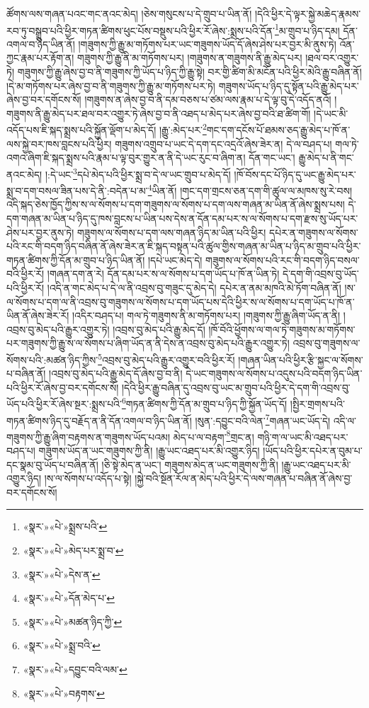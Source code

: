 ཚོགས་ལས་གཞན་པའང་གང་ནའང་མེད། །ཅེས་གསུངས་པ་དེ་གྲུབ་པ་ཡིན་ནོ། །དེའི་ཕྱིར་དེ་ལྟར་སྐྱེ་མཆེད་རྣམས་རབ་ཏུ་བསྒྲུབ་པའི་ཕྱིར་གཏན་ཚིགས་ཕུང་པོས་བསྡུས་པའི་ཕྱིར་རོ་ཞེས་:སྨྲས་པའི་དོན་\footnote{«སྣར་»«པེ་»སྨྲས་པའི་}མ་གྲུབ་པ་ཉིད་དམ། དོན་འགལ་བ་ཉིད་ཡིན་ནོ། །གཟུགས་ཀྱི་རྒྱུ་མ་གཏོགས་པར་ཡང་གཟུགས་ཡོད་དོ་ཞེས་ཤེས་པར་བྱར་མི་ནུས་ཏེ། འོན་ཀྱང་རྣམ་པར་རྟོག་ན། གཟུགས་ཀྱི་རྒྱུ་ནི་མ་གཏོགས་པར། །གཟུགས་ན་གཟུགས་ནི་རྒྱུ་མེད་པར། །ཐལ་བར་འགྱུར་ཏེ། གཟུགས་ཀྱི་རྒྱུ་ཞེས་བྱ་བ་ནི་གཟུགས་ཀྱི་ཡོད་པ་ཉིད་ཀྱི་རྒྱུ་སྟེ། བར་གྱི་ཚིག་མི་མངོན་པའི་ཕྱིར་མེའི་རྒྱུ་བཞིན་ནོ། །དེ་མ་གཏོགས་པར་ཞེས་བྱ་བ་ནི་གཟུགས་ཀྱི་རྒྱུ་མ་གཏོགས་པར་ཏེ། གཟུགས་ཡོད་པ་ཉིད་དུ་སྟོན་པའི་རྒྱུ་མེད་པར་ཞེས་བྱ་བར་དགོངས་སོ། །གཟུགས་ན་ཞེས་བྱ་བ་ནི་དམ་བཅས་པ་ཙམ་ལས་རྣམ་པ་དེ་ལྟ་བུ་དེ་འདོད་ནའོ། །གཟུགས་ནི་རྒྱུ་མེད་པར་ཐལ་བར་འགྱུར་ཏེ་ཞེས་བྱ་བ་ནི་འཐད་པ་མེད་པར་ཞེས་བྱ་བའི་ཐ་ཚིག་གོ། །དེ་ཡང་མི་འདོད་པས་ཇི་སྐད་སྨྲས་པའི་སྐྱོན་ལྡོག་པ་མེད་དོ། །རྒྱུ་:མེད་པར་\footnote{«སྣར་»«པེ་»མེད་པར་སྨྲ་བ་}གང་དག་དངོས་པོ་ཐམས་ཅད་རྒྱུ་མེད་པ་ཁོ་ན་ལས་སྐྱེ་བར་ཁས་བླངས་པའི་ཕྱིར། གཟུགས་འགྲུབ་པ་ཡང་དེ་དག་དང་འདྲའོ་ཞེས་ཟེར་ན། དེ་ལ་བཤད་པ། གལ་ཏེ་འགའ་ཞིག་ཇི་སྐད་སྨྲས་པའི་རྣམ་པ་ལྟ་བུར་གྱུར་ན་ནི་དེ་ཡང་རུང་བ་ཞིག་ན། དོན་གང་ཡང་། རྒྱུ་མེད་པ་ནི་གང་ནའང་མེད། །:དེ་ཡང་\footnote{«སྣར་»«པེ་»དེས་ན་}དཔེ་མེད་པའི་ཕྱིར་སྨྲ་བ་དེ་ལ་ཡང་གྲུབ་པ་མེད་དོ། །ཁོ་བོས་དང་པོ་ཉིད་དུ་ཡང་རྒྱུ་མེད་པར་སྨྲ་བ་དག་བསལ་ཟིན་པས་དེ་ནི་:བདེན་པ་མ་\footnote{«སྣར་»«པེ་»དོན་མེད་པ་}ཡིན་ནོ། །གང་དག་གྲངས་ཅན་དག་གི་ཚུལ་ལ་མཁས་སུ་རེ་བས། འདི་སྐད་ཅེས་ཁྱོད་ཀྱིས་ས་ལ་སོགས་པ་དག་གཟུགས་ལ་སོགས་པ་དག་ལས་གཞན་མ་ཡིན་ནོ་ཞེས་སྨྲས་པས། དེ་དག་གཞན་མ་ཡིན་པ་ཉིད་དུ་ཁས་བླངས་པ་ཡིན་པས་དེས་ན་དོན་དམ་པར་ས་ལ་སོགས་པ་དག་རྫས་སུ་ཡོད་པར་ཤེས་པར་བྱར་ནུས་ཏེ། གཟུགས་ལ་སོགས་པ་དག་ལས་གཞན་ཉིད་མ་ཡིན་པའི་ཕྱིར། དཔེར་ན་གཟུགས་ལ་སོགས་པའི་རང་གི་བདག་ཉིད་བཞིན་ནོ་ཞེས་ཟེར་ན་ཇི་སྐད་བསྟན་པའི་ཚུལ་གྱིས་གཞན་མ་ཡིན་པ་ཉིད་མ་གྲུབ་པའི་ཕྱིར་གཏན་ཚིགས་ཀྱི་དོན་མ་གྲུབ་པ་ཉིད་ཡིན་ནོ། །དཔེ་ཡང་མེད་དེ། གཟུགས་ལ་སོགས་པའི་རང་གི་བདག་ཉིད་བསལ་བའི་ཕྱིར་རོ། །གཞན་དག་ན་རེ། དོན་དམ་པར་ས་ལ་སོགས་པ་དག་ཡོད་པ་ཁོ་ན་ཡིན་ཏེ། དེ་དག་གི་འབྲས་བུ་ཡོད་པའི་ཕྱིར་རོ། །འདི་ན་གང་མེད་པ་དེ་ལ་ནི་འབྲས་བུ་གཟུང་དུ་མེད་དེ། དཔེར་ན་ནམ་མཁའི་མེ་ཏོག་བཞིན་ནོ། །ས་ལ་སོགས་པ་དག་ལ་ནི་འབྲས་བུ་གཟུགས་ལ་སོགས་པ་དག་ཡོད་པས་དེའི་ཕྱིར་ས་ལ་སོགས་པ་དག་ཡོད་པ་ཁོ་ན་ཡིན་ནོ་ཞེས་ཟེར་རོ། །འདིར་བཤད་པ། གལ་ཏེ་གཟུགས་ནི་མ་གཏོགས་པར། །གཟུགས་ཀྱི་རྒྱུ་ཞིག་ཡོད་ན་ནི། །འབྲས་བུ་མེད་པའི་རྒྱུར་འགྱུར་ཏེ། །འབྲས་བུ་མེད་པའི་རྒྱུ་མེད་དོ། །ཁོ་བོའི་ཕྱོགས་ལ་གལ་ཏེ་གཟུགས་མ་གཏོགས་པར་གཟུགས་ཀྱི་རྒྱུ་ས་ལ་སོགས་པ་ཞིག་ཡོད་ན་ནི་དེས་ན་འབྲས་བུ་མེད་པའི་རྒྱུར་འགྱུར་ཏེ། འབྲས་བུ་གཟུགས་ལ་སོགས་པའི་:མཚན་ཉིད་ཀྱིས་\footnote{«སྣར་»«པེ་»མཚན་ཉིད་ཀྱི་}འབྲས་བུ་མེད་པའི་རྒྱུར་འགྱུར་བའི་ཕྱིར་རོ། །གཞན་ཡིན་པའི་ཕྱིར་རྩི་སྐྱང་ལ་སོགས་པ་བཞིན་ནོ། །འབྲས་བུ་མེད་པའི་རྒྱུ་མེད་དོ་ཞེས་བྱ་བ་ནི། དེ་ཡང་གཟུགས་ལ་སོགས་པ་འདུས་པའི་བདག་ཉིད་ཡིན་པའི་ཕྱིར་རོ་ཞེས་བྱ་བར་དགོངས་སོ། །དེའི་ཕྱིར་རྒྱུ་བཞིན་དུ་འབྲས་བུ་ཡང་མ་གྲུབ་པའི་ཕྱིར་དེ་དག་གི་འབྲས་བུ་ཡོད་པའི་ཕྱིར་རོ་ཞེས་སྔར་:སྨྲས་པའི་\footnote{«སྣར་»«པེ་»སྨྲ་བའི་}གཏན་ཚིགས་ཀྱི་དོན་མ་གྲུབ་པ་ཉིད་ཀྱི་སྐྱོན་ཡོད་དོ། །སྤྱིར་གྲགས་པའི་གཏན་ཚིགས་ཉིད་དུ་བརྗོད་ན་ནི་དོན་འགལ་བ་ཉིད་ཡིན་ནོ། །སུན་:དབྱུང་བའི་ལེན་\footnote{«སྣར་»«པེ་»དབྱུང་བའི་ལམ་}གཞན་ཡང་ཡོད་དེ། འདི་ལ་གཟུགས་ཀྱི་རྒྱུ་ཞིག་བརྟགས་ན་གཟུགས་ཡོད་པའམ། མེད་པ་ལ་བརྟག་\footnote{«སྣར་»«པེ་»བརྟགས་}གྲང་ན། གཉི་ག་ལ་ཡང་མི་འཐད་པར་བཤད་པ། གཟུགས་ཡོད་ན་ཡང་གཟུགས་ཀྱི་ནི། །རྒྱུ་ཡང་འཐད་པར་མི་འགྱུར་ཉིད། །ཡོད་པའི་ཕྱིར་དཔེར་ན་བུམ་པ་དང་སྣམ་བུ་ཡོད་པ་བཞིན་ནོ། །ཅི་སྟེ་མེད་ན་ཡང་། གཟུགས་མེད་ན་ཡང་གཟུགས་ཀྱི་ནི། །རྒྱུ་ཡང་འཐད་པར་མི་འགྱུར་ཉིད། །ས་ལ་སོགས་པ་འདོད་པ་སྟེ། །སྐྱེ་བའི་སྔོན་རོལ་ན་མེད་པའི་ཕྱིར་དེ་ལས་གཞན་པ་བཞིན་ནོ་ཞེས་བྱ་བར་དགོངས་སོ། 